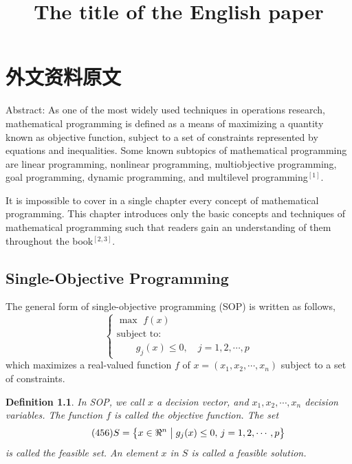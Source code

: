 \chapter{外文资料原文}
\label{cha:engorg}

\title{The title of the English paper}

Abstract: As one of the most widely used techniques in operations
research, mathematical programming is defined as a means of maximizing a
quantity known as objective function, subject to a set of constraints
represented by equations and inequalities. Some known subtopics of mathematical
programming are linear programming, nonlinear programming, multiobjective
programming, goal programming, dynamic programming, and multilevel
programming$^{[1]}$.

It is impossible to cover in a single chapter every concept of mathematical
programming. This chapter introduces only the basic concepts and techniques of
mathematical programming such that readers gain an understanding of them
throughout the book$^{[2,3]}$.


\section{Single-Objective Programming}
The general form of single-objective programming (SOP) is written
as follows,
\begin{equation}\tag*{(123)} %
\left\{\begin{array}{l}
\max \,\,f(x)\\[0.1 cm]
\mbox{subject to:} \\ [0.1 cm]
\qquad g_j(x)\le 0,\quad j=1,2,\cdots,p
\end{array}\right.
\end{equation}
which maximizes a real-valued function $f$ of
$x=(x_1,x_2,\cdots,x_n)$ subject to a set of constraints.

\newtheorem{mpdef}{Definition}[chapter]
\begin{mpdef}
In SOP, we call $x$ a decision vector, and
$x_1,x_2,\cdots,x_n$ decision variables. The function
$f$ is called the objective function. The set
\begin{equation}\tag*{(456)} %
S=\left\{x\in\Re^n\bigm|g_j(x)\le 0,\,j=1,2,\cdots,p\right\}
\end{equation}
is called the feasible set. An element $x$ in $S$ is called a
feasible solution.
\end{mpdef}

